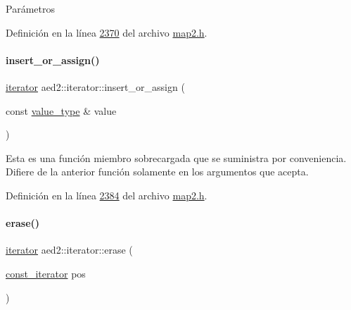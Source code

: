 \begin{DoxyParams}{\-Parámetros}
\begin{DoxyCompactItemize}
Definición en la línea \hyperlink{map2_8h_source_l02370}{2370} del archivo \hyperlink{map2_8h_source}{map2.\+h}.

\mbox{\label{classaed2_1_1iterator_af131c4b0d89978372a0c8ce38bf8f33e_af131c4b0d89978372a0c8ce38bf8f33e}} 
\paragraph{\texorpdfstring{insert\+\_\+or\+\_\+assign()}{insert\_or\_assign()}\hspace{0.1cm}{\footnotesize\ttfamily [2/2]}}
{\footnotesize\ttfamily \hyperlink{classaed2_1_1iterator_1_1iterator}{iterator} aed2\+::iterator\+::insert\+\_\+or\+\_\+assign (\begin{DoxyParamCaption}\item[{const \hyperlink{classaed2_1_1iterator_a6411a2c08b2b7c52f063bef1a168acb6_a6411a2c08b2b7c52f063bef1a168acb6}{value\+\_\+type} \&}]{value }\end{DoxyParamCaption})\hspace{0.3cm}{\ttfamily [inline]}}

Esta es una función miembro sobrecargada que se suministra por conveniencia. Difiere de la anterior función solamente en los argumentos que acepta. 

Definición en la línea \hyperlink{map2_8h_source_l02384}{2384} del archivo \hyperlink{map2_8h_source}{map2.\+h}.

\mbox{\label{classaed2_1_1iterator_adf371aaec9e68bd4a4d5a889d0b6b679_adf371aaec9e68bd4a4d5a889d0b6b679}} 
\paragraph{\texorpdfstring{erase()}{erase()}\hspace{0.1cm}{\footnotesize\ttfamily [1/2]}}
{\footnotesize\ttfamily \hyperlink{classaed2_1_1iterator_1_1iterator}{iterator} aed2\+::iterator\+::erase (\begin{DoxyParamCaption}\item[{\hyperlink{classaed2_1_1iterator_1_1const__iterator}{const\+\_\+iterator}}]{pos }\end{DoxyParamCaption})\hspace{0.3cm}{\ttfamily [inline]}}




\end{DoxyCompactItemize}
\end{DoxyParams}
